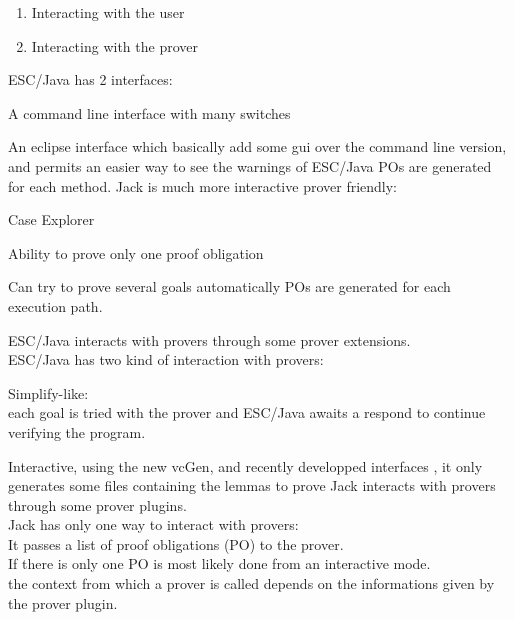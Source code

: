 \begin{enumerate}
\item Interacting with the user
\item Interacting with the prover
\end{enumerate}
ESC/Java has 2 interfaces:
\blist
\item A {\purple command line} interface with many switches
\item An eclipse interface which basically add some gui
  over the command line version, and permits an easier way 
  to see the {\purple warnings} of ESC/Java
\elist
POs are generated for {\purple each method}.
Jack is much more interactive prover friendly:
\blist
\item Case Explorer
\item Ability to prove only {\purple one} proof obligation
\item Can try to prove several goals automatically
\elist
POs are generated for each {\purple execution path}.

\small
ESC/Java interacts with provers through some prover extensions.\\
ESC/Java has two kind of interaction with provers:
\blist
\item Simplify-like: \\each goal is tried with the prover and ESC/Java 
{\purple awaits}
a respond to continue verifying the program.
\item Interactive, using the {\purple new vcGen}, and recently developped interfaces
, it only generates some
files containing the lemmas to prove
\elist
{} \small
Jack interacts with provers through some prover plugins.\\

Jack has only one way to interact with provers:\\
\rarrow It passes a {\purple list of proof obligations} (PO) to the prover.\\
If there is only one PO is most likely done from an interactive
mode.\\
\rarrow the context from which a prover is called depends on
the informations given by the {\purple prover plugin}.
